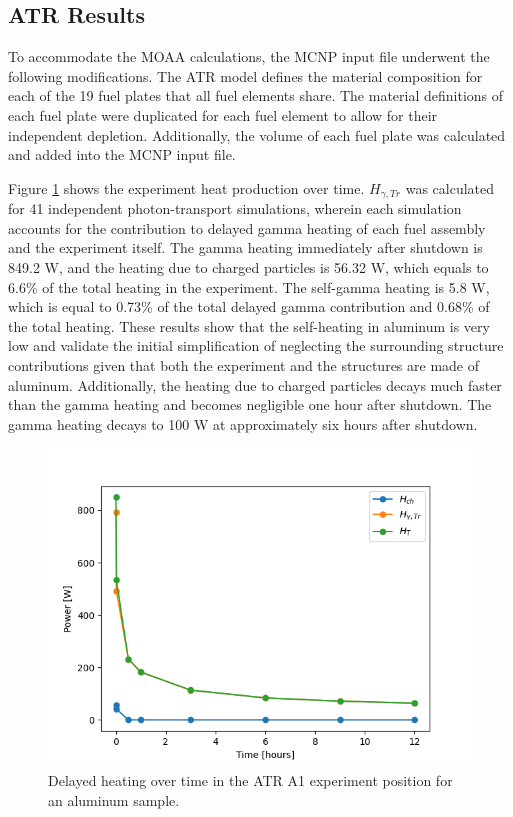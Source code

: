 \subsection{ATR Results}

To accommodate the MOAA calculations, the MCNP input file underwent the following modifications.
The ATR model defines the material composition for each of the 19 fuel plates that all fuel elements share.
The material definitions of each fuel plate were duplicated for each fuel element to allow for their independent depletion.
Additionally, the volume of each fuel plate was calculated and added into the MCNP input file.

Figure \ref{fig:atr-time} shows the experiment heat production over time.
$H_{\gamma,Tr}$ was calculated for 41 independent photon-transport simulations, wherein each simulation accounts for the contribution to delayed gamma heating of each fuel assembly and the experiment itself.
The gamma heating immediately after shutdown is 849.2 W, and the heating due to charged particles is 56.32 W, which equals to 6.6\% of the total heating in the experiment.
The self-gamma heating is 5.8 W, which is equal to 0.73\% of the total delayed gamma contribution and 0.68\% of the total heating.
These results show that the self-heating in aluminum is very low and validate the initial simplification of neglecting the surrounding structure contributions given that both the experiment and the structures are made of aluminum.
Additionally, the heating due to charged particles decays much faster than the gamma heating and becomes negligible one hour after shutdown.
The gamma heating decays to 100 W at approximately six hours after shutdown.

\begin{figure}[htbp!] %
    \centering
    \includegraphics[width=0.65\linewidth]{figures/atr-decay-heat-time}
    \hfill
    \caption{Delayed heating over time in the ATR A1 experiment position for an aluminum sample.}
    \label{fig:atr-time}
\end{figure}

